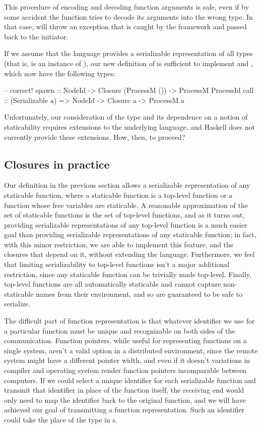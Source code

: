 \documentclass[preprint]{sigplanconf}
\begin{document}
This procedure of encoding and decoding function arguments is safe, even if by some accident the function tries to decode its arguments into the wrong type. In that case,  will throw an exception that is caught by the framework and passed back to the initiator.

If we assume that the language provides a serializable representation of all  types (that is,  is an instance of ), our new definition of  is sufficient to implement  and , which now have the following types:

\begin{code}
-- correct!
spawn :: NodeId -> Closure (ProcessM ()) -> ProcessM ProcessId
call :: (Serializable a) => NodeId -> Closure a -> ProcessM a
\end{code}

Unfortunately, our consideration of the  type and its dependence on a notion of staticability requires extensions to the underlying language, and Haskell does not currently provide these extensions. How, then, to proceed?

\subsection{Closures in practice}

Our definition in the previous section allows a serializable representation of any staticable function, where a staticable function is a top-level function or a function whose free variables are staticable. A reasonable approximation of the set of staticable functions is the set of top-level functions, and as it turns out, providing serializable representations of any top-level function is a much easier goal than providing serializable representations of any staticable function; in fact, with this minor restriction, we are able to implement this feature, and the closures that depend on it, without extending the language. Furthermore, we feel that limiting serializability to top-level functions isn't a major additional restriction, since any staticable function can be trivially made top-level. Finally, top-level functions are all automatically staticable and cannot capture non-staticable names from their environment, and so are guaranteed to be safe to serialize.

The difficult part of function representation is that whatever identifier we use for a particular function must be unique and recognizable on both sides of the communication. Function pointers, while useful for representing functions on a single system, aren't a valid option in a distributed environment, since the remote system might have a different pointer width, and even if it doesn't variations in compiler and operating system render function pointers incomparable between computers. If we could select a unique identifier for each serializable function and transmit that identifier in place of the function itself, the receiving end would only need to map the identifier back to the original function, and we will have achieved our goal of transmitting a function representation. Such an identifier could take the place of the  type in s.
\end{document}

